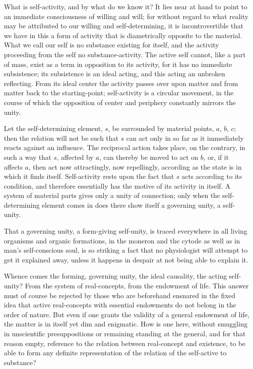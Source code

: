 \documentclass[12pt]{book}
\begin{document}
What is self-activity, and by what do we know it? It lies near at hand to point to an
immediate consciousness of willing and will; for without regard to what reality may be
attributed to our willing and self-determining, it is incontrovertible that we have in this
a form of activity that is diametrically opposite to the material. What we call our self is
no substance existing for itself, and the activity proceeding from the self no
substance-activity. The active self cannot, like a part of mass, exist as a term in
opposition to its activity, for it has no immediate subsistence; its subsistence is an
ideal acting, and this acting an unbroken reflecting. From its ideal center the activity
passes over upon matter and from matter back to the starting-point; self-activity is a
circular movement, in the course of which the opposition of center and periphery constantly
mirrors the unity.

Let the self-determining element, $s$, be surrounded by material points, $a$, $b$, $c$; then
the relation will not be such that $s$ can act only in so far as it immediately reacts
against an influence. The reciprocal action takes place, on the contrary, in such a way that
$s$, affected by $a$, can thereby be moved to act on $b$, or, if it affects $a$, then act
now attractingly, now repellingly, according as the state is in which it finds itself.
Self-activity rests upon the fact that $s$ acts according to its condition, and therefore
essentially has the motive of its activity in itself. A system of material parts gives only
a unity of connection; only when the self-determining element comes in does there show
itself a governing unity, a self-unity.

That a governing unity, a form-giving self-unity, is traced everywhere in all living
organisms and organic formations, in the moneron and the cytode as well as in man's
self-conscious soul, is so striking a fact that no physiologist will attempt to get it
explained away, unless it happens in despair at not being able to explain it.

Whence comes the forming, governing unity, the ideal causality, the acting self-unity? From
the system of real-concepts, from the endowment of life. This answer must of course be
rejected by those who are beforehand ensnared in the fixed idea that active real-concepts
with essential endowments do not belong in the order of nature. But even if one grants the
validity of a general endowment of life, the matter is in itself yet dim and enigmatic. How
is one here, without smuggling in unscientific presuppositions or remaining standing at the
general, and for that reason empty, reference to the relation between real-concept and
existence, to be able to form any definite representation of the relation of the self-active
to substance?
\end{document}
